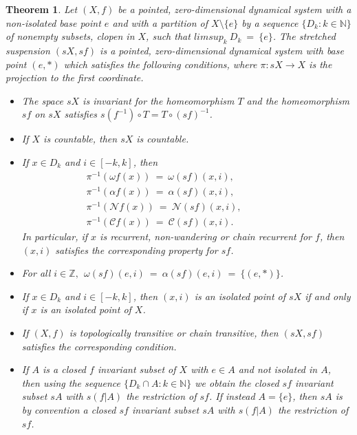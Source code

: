 \documentclass[12pt]{amsart}
\newtheorem{theo}{{\bfseries Theorem}}[section]
\def \N {\mathbb N}
\def \Z {\mathbb Z}
\def \CC {\mathcal C}
\def \NN {\mathcal N}
\def \a {\alpha }
\def \om {\omega}
\numberwithin{equation}{section}
\begin{document}
\begin{theo}\label{theo2.01} Let  $(X,f)$ be a pointed, zero-dimensional dynamical system with a non-isolated base point $e$
 and with a partition of $X \setminus \{ e \}$ by a sequence $\{ D_k : k \in \N \}$ of nonempty subsets, clopen in $X$,
  such that $limsup_k \  D_k \ = \ \{ e \}$.
The \emph{stretched suspension} $(sX,sf)$ is a pointed, zero-dimensional dynamical system with base point $(e,*)$
which satisfies the following conditions, where $\pi : sX \to X$ is the
projection to the first coordinate.
 \begin{itemize}
 \item[(i)] The space $sX$ is invariant for the homeomorphism $T$ and the homeomorphism $sf$ on $sX$ satisfies
 $s(f^{-1}) \circ T = T \circ (sf)^{-1}$.

  \item[(ii)]If $X$ is countable, then $sX$ is countable.

 \item[(iii)] If $x \in D_k$ and $i \in [-k,k]$, then
 \begin{equation}\label{eq2.05}\begin{split}
 \pi^{-1}(\om f(x)) \ = \ \om (sf)(x,i), \hspace{2cm}\\
  \pi^{-1}(\a f(x)) \ = \ \a (sf)(x,i), \hspace{2cm}\\
\pi^{-1}(\NN f(x)) \ = \ \NN (sf)(x,i), \hspace{2cm}\\
\pi^{-1}(\CC f(x)) \ = \ \CC (sf)(x,i). \hspace{2cm}
\end{split}\end{equation}
In particular, if $x$ is recurrent, non-wandering or chain recurrent for $f$, then $(x,i)$ satisfies the
corresponding property for $sf$.


\item[(iv)] For all $i \in \Z, \ \ \om (sf)(e,i) \ = \ \a (sf)(e,i) \ = \ \{(e, *) \}$.


\item[(v)] If $x \in D_k$ and $i \in [-k,k]$, then $(x,i)$ is an isolated point of $sX$ if and only if $x$ is an isolated point of $X$.


\item[(vi)] If $(X,f)$ is topologically transitive or chain transitive, then $(sX, sf)$ satisfies the corresponding condition.

\item[(vii)] If $A$ is a closed $f$ invariant subset of $X$ with $e \in A$ and not isolated in $A$, then using
the sequence $\{ D_k \cap A : k \in \N \}$ we obtain the closed $sf$ invariant subset $sA$ with $s(f|A)$ the restriction of $sf$.
If instead $A = \{ e \}$, then $sA$ is by convention a closed $sf$ invariant subset $sA$ with $s(f|A)$ the restriction of $sf$.



\end{itemize}\end{theo}
\end{document}
